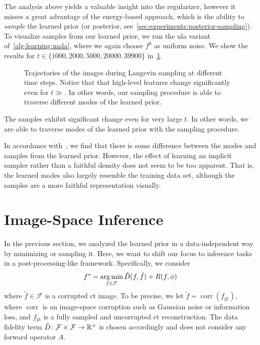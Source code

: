 \documentclass[../ml-ct.tex]{subfiles}
\begin{document}
The analysis above yields a valuable insight into the regularizer, however it misses a great advantage of the energy-based approach, which is the ability to \emph{sample} the learned prior (or posterior, see~\cref{sec:experiments:posterior-sampling}).
To visualize samples from our learned prior, we run the \gls{ula} variant of~\cref{alg:learning:mala}, where we again choose \( f^0 \) as uniform noise.
We show the results for \( t \in \{ \num{1000}, \num{2000}, \num{5000}, \num{20000}, \num{39900} \} \) in~\cref{fig:experiments:sampling}.
\begin{figure}
	\centering
	\caption[Trajectories of the images during Langevin sampling at different time steps.]{%
		Trajectories of the images during Langevin sampling at different time steps.
		Notice that that high-level features change significantly even for \( t \gg \).
		In other words, our sampling procedure is able to traverse different modes of the learned prior.
	}%
	\label{fig:experiments:sampling}
\end{figure}
The samples exhibit significant change even for very large \( t \).
In other words, we are able to traverse modes of the learned prior with the sampling procedure.

In accordance with~\cite{nijkamp_anatomy_2019}, we find that there is some difference between the modes and samples from the learned prior.
However, the effect of learning an implicit sampler rather than a faithful density does not seem to be too apparent.
That is, the learned modes also largely resemble the training data set, although the samples are a more faithful representation visually.
\section{Image-Space Inference}
In the previous section, we analyzed the learned prior in a data-independent way by minimizing or sampling it.
Here, we want to shift our focus to inference tasks in a post-processing-like framework.
Specifically, we consider
\begin{equation}
	f^*_{\text{}} = \operatorname*{arg\,min}_{f \in \mathcal{F}} \tilde{D}(f, \tilde{f}) + R(f, \phi)
\end{equation}
where \( \tilde{f} \in \mathcal{F} \) is a corrupted \gls{ct} image.
To be precise, we let \( \tilde{f} = \operatorname{corr}(f_\text{gt}) \), where \( \operatorname{corr} \) is an image-space corruption such as Gaussian noise or information loss, and \( f_\text{gt} \) is a fully sampled and uncorrupted \gls{ct} reconstruction.
The data fidelity term \( \tilde{D}\colon\mathcal{F} \times \mathcal{F}\to\mathbb{R}^+ \) is chosen accordingly and does not consider any forward operator \( A \).
\end{document}
